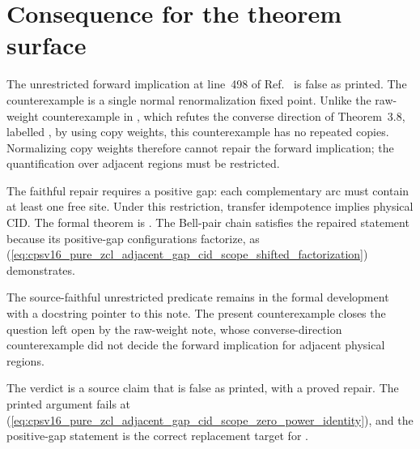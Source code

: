 \documentclass{article}
\begin{document}
\section{Consequence for the theorem surface}

The unrestricted forward implication at line~498 of
Ref.~\cite{Cirac2016MPDO_arXiv} is false as printed. The counterexample is a
single normal renormalization fixed point. Unlike the raw-weight
counterexample in
, which refutes the
converse direction of Theorem~3.8, labelled , by using
copy weights, this counterexample has no repeated copies. Normalizing copy
weights therefore cannot repair the forward implication; the quantification
over adjacent regions must be restricted.

The faithful repair requires a positive gap: each complementary arc must
contain at least one free site. Under this restriction, transfer idempotence
implies physical CID. The formal theorem is
. The
Bell-pair chain satisfies the repaired statement because its positive-gap
configurations factorize, as
(\ref{eq:cpsv16_pure_zcl_adjacent_gap_cid_scope_shifted_factorization})
demonstrates.

The source-faithful unrestricted predicate
 remains in the formal development with a
docstring pointer to this note. The present counterexample closes the question
left open by the raw-weight note, whose converse-direction counterexample did
not decide the forward implication for adjacent physical regions.

The verdict is a source claim that is false as printed, with a proved repair.
The printed argument fails at
(\ref{eq:cpsv16_pure_zcl_adjacent_gap_cid_scope_zero_power_identity}), and the
positive-gap statement is the correct replacement target for .



\end{document}
